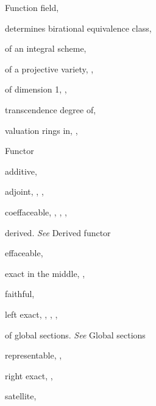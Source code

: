 {{\noindent\hspace*{0.0bp}Function field, \par
\noindent\hspace*{7.5bp}determines birational equivalence class,\par
\noindent\hspace*{15.0bp}\par
\noindent\hspace*{7.5bp}of an integral scheme, \par
\noindent\hspace*{7.5bp}of a projective variety, , \par
\noindent\hspace*{7.5bp}of dimension 1, , \par
\noindent\hspace*{7.5bp}transcendence degree of, \par
\noindent\hspace*{7.5bp}valuation rings in, , \par
\noindent\hspace*{0.0bp}Functor\par
\noindent\hspace*{7.5bp}additive, \par
\noindent\hspace*{7.5bp}adjoint, , , \par
\noindent\hspace*{7.5bp}coeffaceable, , , , \par
\noindent\hspace*{7.5bp}derived. \emph{See} Derived functor\par
\noindent\hspace*{7.5bp}effaceable, \par
\noindent\hspace*{7.5bp}exact in the middle, , \par
\noindent\hspace*{7.5bp}faithful, \par
\noindent\hspace*{7.5bp}left exact, , , , \par
\noindent\hspace*{7.5bp}of global sections. \emph{See} Global sections\par
\noindent\hspace*{7.5bp}representable, , \par
\noindent\hspace*{7.5bp}right exact, , \par
\noindent\hspace*{7.5bp}satellite, \par
}
}
